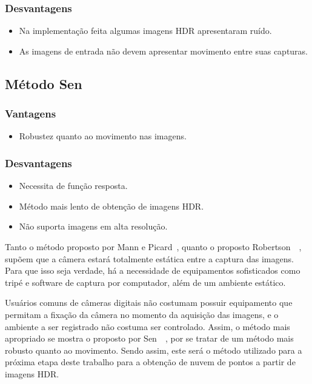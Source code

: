 \subsubsection{Desvantagens}
\begin{itemize}
	\item Na implementação feita algumas imagens HDR apresentaram ruído.
	\item As imagens de entrada não devem apresentar movimento entre suas capturas.
\end{itemize}

\subsection{Método Sen} \label{discussaoSen}
\subsubsection{Vantagens}
\begin{itemize}
	\item Robustez quanto ao movimento nas imagens.
\end{itemize}
\subsubsection{Desvantagens}
\begin{itemize}
	\item Necessita de função resposta.
	\item Método mais lento de obtenção de imagens HDR.
	\item Não suporta imagens em alta resolução.
\end{itemize}

Tanto o método proposto por Mann e Picard~\cite{mann}, quanto o proposto Robertson~\etal~\cite{robertson}, supõem que a câmera estará totalmente estática entre a captura das imagens. Para que isso seja verdade, há a necessidade de equipamentos sofisticados como tripé e software de captura por computador, além de um ambiente estático. 

Usuários comuns de câmeras digitais não costumam possuir equipamento que permitam a fixação da câmera no momento da aquisição das imagens, e o ambiente a ser registrado não costuma ser controlado. Assim, o método mais apropriado se mostra o proposto por Sen~\etal~\cite{hdrMovimento}, por se tratar de um método mais robusto quanto ao movimento. Sendo assim, este será o método utilizado para a próxima etapa deste trabalho para a obtenção de nuvem de pontos a partir de imagens HDR.
